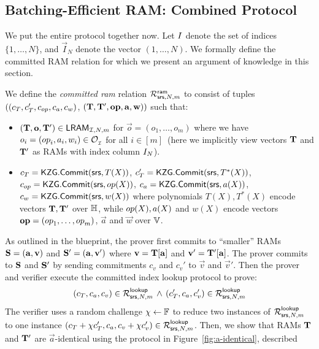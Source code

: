 \subsection{Batching-Efficient RAM: Combined Protocol}\label{subsec:all-together}
We put the entire protocol together now. Let $I$ denote the set of indices $\{1,\ldots,N\}$, and $\vec{I}_N$
denote the vector $(1,\ldots,N)$. We formally define the committed RAM relation for which we present an argument of
knowledge in this section.
\begin{definition}\label{defn:committed-ram}
We define the {\em committed ram} relation
$\mathcal{R}^{\mathsf{ram}}_{\mathsf{srs},N,m}$ to consist of tuples $((c_T, c_T', c_{op}, c_a, c_w)$, $(\mathbf{T}, \mathbf{T}',\mathbf{{op}},\mathbf{a},\mathbf{w}))$
such that:
\begin{itemize}[leftmargin=1em]
    \item $(\mathbf{T},\mathbf{o},\mathbf{T}')\in \mathsf{LRAM}_{\mathcal{I},N,m}$ for $\vec{o}=(o_1,\ldots,o_m)$ where we have $o_i=({op}_i, a_i, w_i)\in \mathcal{O}_{{}_\mathcal{I}}$ for all $i\in [m]$~(here we implicitly view vectors $\mathbf{T}$ and $\mathbf{T}'$ as RAMs with index column $I_N$). 
    
   
    \item $c_T=\mathsf{KZG.Commit}(\mathsf{srs}, T(X))$, $c_T'=\mathsf{KZG.Commit}(\mathsf{srs}, T^*(X))$, $c_{op} = \mathsf{KZG.Commit}(\mathsf{srs},{op}(X))$,  $c_a=\mathsf{KZG.Commit}(\mathsf{srs}, a(X))$,
    $c_w = \mathsf{KZG.Commit}(\mathsf{srs}, w(X))$ where polynomials $T(X), T^*(X)$ encode vectors $\mathbf{T}, \mathbf{T}'$ over $\mathbb{H}$, while ${op}(X), a(X)$ and
    $w(X)$ encode vectors $\mathbf{{op}}=({op}_1,\ldots,{op}_m)$, $\vec{a}$ and $\vec{w}$ over $\mathbb{V}$.
\end{itemize}
\end{definition}
As outlined in the blueprint, the prover first commits to ``smaller'' RAMs $\mathbf{S}=(\mathbf{a},\mathbf{v})$ and $\mathbf{S}'=(\mathbf{a},\mathbf{v}')$
where $\mathbf{v}=\mathbf{T}[\mathbf{a}]$ and $\mathbf{v}'=\mathbf{T}'[\mathbf{a}]$. The prover commits to $\mathbf{S}$ and $\mathbf{S}'$ by sending commitments
$c_v$ and $c_v'$ to $\vec{v}$ and $\vec{v}'$. Then the prover and verifier execute the committed index lookup protocol to
prove:
\begin{equation}
(c_T, c_a, c_v)\in \mathcal{R}^{\mathsf{lookup}}_{\mathsf{srs},N,m}\, \wedge\, (c_T', c_a, c_v')\in \mathcal{R}^{\mathsf{lookup}}_{\mathsf{srs},N,m}
\end{equation}
The verifier uses a random challenge $\chi\gets \mathbb{F}$ to reduce two instances of $\mathcal{R}^{\mathsf{lookup}}_{\mathsf{srs},N,m}$ to one instance
$(c_T + \chi c_T', c_a, c_v + \chi c_v')\in \mathcal{R}^{\mathsf{lookup}}_{\mathsf{srs},N,m}$. Then, we show that
RAMs $\mathbf{T}$ and $\mathbf{T}'$ are $\vec{a}$-identical using the protocol in Figure~\ref{fig:a-identical}, described
